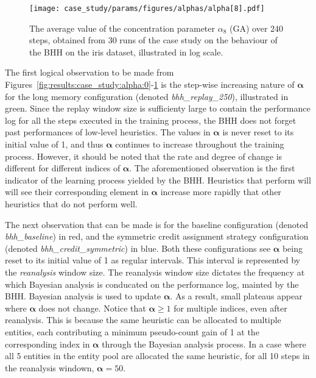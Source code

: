 \begin{figure}[htpb]
	\centering
	\texttt{[image: case\_study/params/figures/alphas/alpha[8].pdf]}
	\caption{The average value of the concentration parameter $\alpha_{8}$ (\acs{GA}) over 240 steps, obtained from 30 runs of the case study on the behaviour of the \acs{BHH} on the iris dataset, illustrated in log scale.}
	\label{fig:results:case_study:alpha:8}
\end{figure}

The first logical observation to be made from Figures~\ref{fig:results:case_study:alpha:0}-\ref{fig:results:case_study:alpha:8} is the step-wise increasing nature of $\boldsymbol{\alpha}$ for the long memory configuration (denoted \textit{bhh\_replay\_250}), illustrated in green. Since the replay window size is sufficienty large to contain the performance log for all the steps executed in the training process, the \acs{BHH} does not forget past performances of low-level heuristics. The values in $\boldsymbol{\alpha}$ is never reset to its initial value of 1, and thus $\boldsymbol{\alpha}$ continues to increase throughout the training process. However, it should be noted that the rate and degree of change is different for different indices of $\boldsymbol{\alpha}$. The aforementioned observation is the first indicator of the learning process yielded by the \acs{BHH}. Heuristics that perform will will see their corresponding element in $\boldsymbol{\alpha}$ increase more rapidly that other heuristics that do not perform well.

The next observation that can be made is for the baseline configuration (denoted \textit{bhh\_baseline}) in red, and the symmetric credit assignment strategy configuration (denoted \textit{bhh\_credit\_symmetric}) in blue. Both these configurations see $\boldsymbol{\alpha}$ being reset to its initial value of 1 as regular intervals. This interval is represented by the \textit{reanalysis} window size. The reanalysis window size dictates the frequency at which Bayesian analysis is conducated on the performance log, mainted by the \acs{BHH}. Bayesian analysis is used to update $\boldsymbol{\alpha}$. As a result, small plateaus appear where $\boldsymbol{\alpha}$ does not change. Notice that $\boldsymbol{\alpha} \geq 1$ for multiple indices, even after reanalysis. This is because the same heuristic can be allocated to multiple entities, each contributing a minimum pseudo-count gain of 1 at the corresponding index in $\boldsymbol{\alpha}$ through the Bayesian analysis process. In a case where all 5 entities in the entity pool are allocated the same heuristic, for all 10 steps in the reanalysis windown, $\boldsymbol{\alpha} = 50$.

